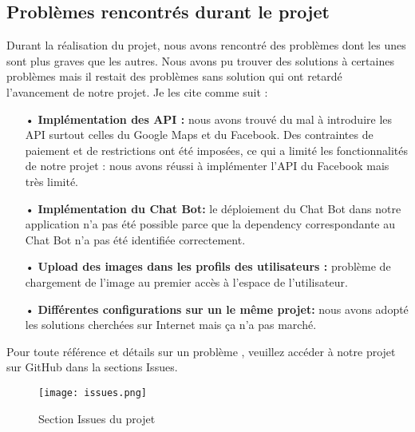 \documentclass[a4paper]{report}
\begin{document}
\begin{spacing}{2}
\section{Problèmes rencontrés durant le projet}
\begin{spacing}{2}
\par 
Durant la réalisation du projet, nous avons rencontré des problèmes dont les unes sont plus graves que les autres. Nous avons pu trouver des solutions à certaines problèmes mais il restait des problèmes sans solution qui ont retardé l'avancement de notre projet. Je les cite comme suit :
\begin{itemize}
\item[•] \textbf{Implémentation des API :} nous avons trouvé du mal à introduire les API surtout celles du Google Maps et du Facebook. Des contraintes de paiement et de restrictions ont été imposées, ce qui a limité les fonctionnalités de notre projet : nous avons réussi à implémenter l'API du Facebook mais très limité. 
\item[•] \textbf{Implémentation du Chat Bot:} le déploiement du Chat Bot dans notre application n'a pas été possible parce que la dependency correspondante au Chat Bot n'a pas été identifiée correctement.
\item[•] \textbf{Upload des images dans les profils des utilisateurs :} problème de chargement de l'image au premier accès à l'espace de l'utilisateur.
\item[•] \textbf{Différentes configurations sur un le même projet:} nous avons adopté les solutions cherchées sur Internet mais ça n'a pas marché. 
\end{itemize} 

\par
Pour toute référence et détails sur un problème , veuillez accéder à notre projet sur GitHub dans la sections Issues. 
\cleardoublepage
\begin{figure}[!ht]
\begin{center}
\texttt{[image: issues.png]}
\end{center}
\caption[Section Issues du projet]{Section Issues du projet\protect\footnotemark}
\end{figure}

\end{spacing}
\end{spacing}
\end{document}
